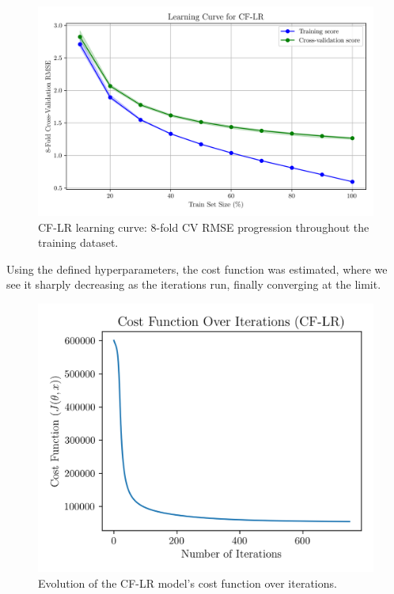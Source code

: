 \documentclass[conference]{IEEEtran}
\begin{document}
\begin{figure}[H]
    \centering
    \includegraphics[width=1\linewidth]{assets/model01_learning_curve.png}
    \caption{CF-LR learning curve: 8-fold CV RMSE progression throughout the training dataset.}
    \label{fig:model01_learning_curve}
\end{figure}

Using the defined hyperparameters, the cost function was estimated, where we see it sharply decreasing as the iterations run, finally converging at the limit.

\begin{figure}[H]
    \centering
    \includegraphics[width=1\linewidth]{assets/model01_cost_function.png}
    \caption{Evolution of the CF-LR model's cost function over iterations.}
    \label{fig:model01_cost_function}
\end{figure}
\end{document}

